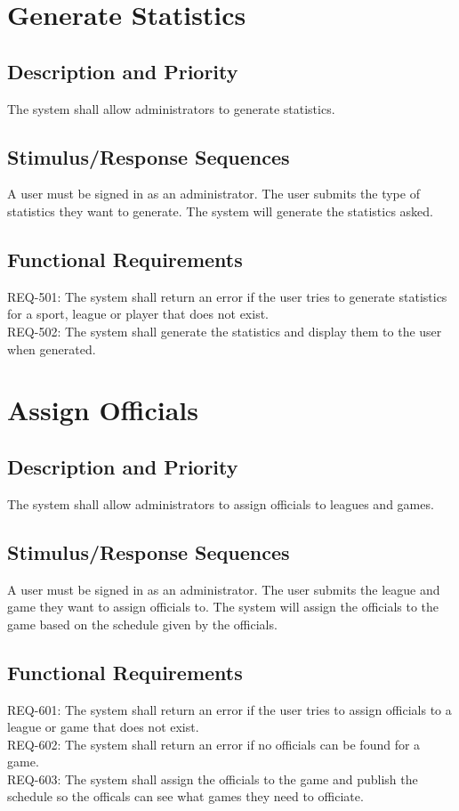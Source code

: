\documentclass{scrreprt}
\begin{document}
\section{Generate Statistics}

    \subsection{Description and Priority}
    The system shall allow administrators to generate statistics.
    \subsection{Stimulus/Response Sequences}
    A user must be signed in as an administrator. The user submits the type of statistics they want to generate. The system will generate the statistics asked.
    \subsection{Functional Requirements}
    REQ-501: The system shall return an error if the user tries to generate statistics for a sport, league or player that does not exist. \\
    REQ-502: The system shall generate the statistics and display them to the user when generated.

\section{Assign Officials}
    \subsection{Description and Priority}
    The system shall allow administrators to assign officials to leagues and games.
    \subsection{Stimulus/Response Sequences}
    A user must be signed in as an administrator. The user submits the league and game they want to assign officials to. The system will assign the officials to the game based on the schedule given by the officials.
    \subsection{Functional Requirements}
    REQ-601: The system shall return an error if the user tries to assign officials to a league or game that does not exist. \\
    REQ-602: The system shall return an error if no officials can be found for a game. \\
    REQ-603: The system shall assign the officials to the game and publish the schedule so the officals can see what games they need to officiate.
\end{document}
